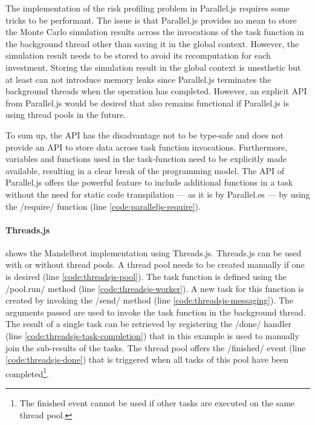 The implementation of the risk profiling problem in Parallel.js requires some tricks to be performant. The issue is that Parallel.js provides no mean to store the Monte Carlo simulation results across the invocations of the task function in the background thread other than saving it in the global context. However, the simulation result needs to be stored to avoid its recomputation for each investment. Storing the simulation result in the global context is unesthetic but at least can not introduce memory leaks since Parallel.js terminates the background threads when the operation has completed. However, an explicit API from Parallel.js would be desired that also remains functional if Parallel.js is using thread pools in the future.

To sum up, the API has the disadvantage not to be type-safe and does not provide an API to store data across task function invocations. Furthermore, variables and functions used in the task-function need to be explicitly made available, resulting in a clear break of the programming model. The API of Parallel.js offers the powerful feature to include additional functions in a task without the need for static code transpilation --- as it is by Parallel.es --- by using the \javascriptinline/require/ function (line \ref{code:paralleljs-require}).

\paragraph{Threads.js}
 shows the Mandelbrot implementation using Threads.js. Threads.js can be used with or without thread pools. A thread pool needs to be created manually if one is desired (line \ref{code:threadsjs-pool}). The task function is defined using the \javascriptinline/pool.run/ method (line \ref{code:threadsjs-worker}). A new task for this function is created by invoking the \javascriptinline/send/ method (line \ref{code:threadsjs-messaging}). The arguments passed are used to invoke the task function in the background thread. The result of a single task can be retrieved by registering the \javascriptinline/done/ handler (line \ref{code:threadsjs-task-completion}) that in this example is used to manually join the sub-results of the tasks. The thread pool offers the \javascriptinline/finished/ event (line \ref{code:threadsjs-done}) that is triggered when all tasks of this pool have been completed\footnote{The finished event cannot be used if other tasks are executed on the same thread pool.}.

